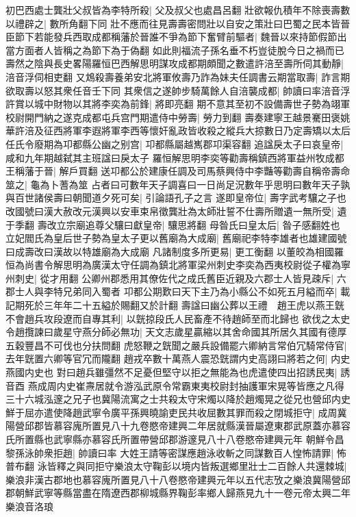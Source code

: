 初巴西處士龔壯父叔皆為李特所殺|{
	父及叔父也處昌呂翻}
壯欲報仇積年不除喪壽數以禮辟之|{
	數所角翻下同}
壯不應而往見壽壽密問壯以自安之策壯曰巴蜀之民本皆晉臣節下若能發兵西取成都稱藩於晉誰不爭為節下奮臂前驅者|{
	魏晉以來持節假節出當方面者人皆稱之為節下為于偽翻}
如此則福流子孫名垂不朽豈徒脫今日之禍而已壽然之陰與長史畧陽羅恒巴西解思明謀攻成都期頗聞之數遣許涪至壽所伺其動靜|{
	涪音浮伺相吏翻}
又鴆殺壽養弟安北將軍攸壽乃詐為妹夫任調書云期當取壽|{
	詐言期欲取壽以怒其衆任音壬下同}
其衆信之遂帥步騎萬餘人自涪襲成都|{
	帥讀曰率涪音浮}
許賞以城中財物以其將李奕為前鋒|{
	將即亮翻}
期不意其至初不設備壽世子勢為翊軍校尉開門納之遂克成都屯兵宫門期遣侍中勞壽|{
	勞力到翻}
壽奏建寧王越景騫田褒姚華許涪及征西將軍李遐將軍李西等懷奸亂政皆收殺之縱兵大掠數日乃定壽矯以太后任氏令廢期為卭都縣公幽之别宫|{
	卭都縣屬越嶲郡卭渠容翻}
追諡戾太子曰哀皇帝|{
	咸和九年期越弑其主班諡曰戾太子}
羅恒解思明李奕等勸壽稱鎮西將軍益州牧成都王稱藩于晉|{
	解戶買翻}
送卭都公於建康任調及司馬蔡興侍中李豔等勸壽自稱帝壽命筮之|{
	龜為卜蓍為筮}
占者曰可數年天子調喜曰一日尚足況數年乎思明曰數年天子孰與百世諸侯壽曰朝聞道夕死可矣|{
	引論語孔子之言}
遂即皇帝位|{
	壽字武考驤之子也}
改國號曰漢大赦改元漢興以安車束帛徵龔壯為太師壯誓不仕壽所贈遺一無所受|{
	遺于季翻}
壽改立宗廟追尊父驤曰獻皇帝|{
	驤思將翻}
母昝氏曰皇太后|{
	昝子感翻姓也}
立妃閻氏為皇后世子勢為皇太子更以舊廟為大成廟|{
	舊廟祀李特李雄者也雄建國號曰成壽改曰漢故以特雄廟為大成廟}
凡諸制度多所更易|{
	更工衡翻}
以董皎為相國羅恒為尚書令解思明為廣漢太守任調為鎮北將軍梁州刺史李奕為西夷校尉從子權為寧州刺史|{
	從才用翻}
公卿州郡悉用其僚佐代之成氏舊臣近親及六郡士人皆見疎斥|{
	六郡士人與李特兄弟同入蜀者}
卭都公期歎曰天下主乃為小縣公不如死五月縊而卒|{
	載記期死於三年年二十五縊於賜翻又於計翻}
壽諡曰幽公葬以王禮　趙王虎以燕王皝不會趙兵攻段遼而自專其利|{
	以皝掠段氏人民畜產不待趙師至而北歸也}
欲伐之太史令趙攬諫曰歲星守燕分師必無功|{
	天文志歲星贏縮以其舍命國其所居久其國有德厚五穀豐昌不可伐也分扶問翻}
虎怒鞭之皝聞之嚴兵設備罷六卿納言常伯冗騎常侍官|{
	去年皝置六卿等官冗而隴翻}
趙戎卒數十萬燕人震恐皝謂内史高詡曰將若之何|{
	内史燕國内史也}
對曰趙兵雖彊然不足憂但堅守以拒之無能為也虎遣使四出招誘民夷|{
	誘音酉}
燕成周内史崔燾居就令游泓武原令常霸東夷校尉封抽護軍宋晃等皆應之凡得三十六城泓邃之兄子也冀陽流寓之士共殺太守宋燭以降於趙燭晃之從兄也營邱内史鮮于屈亦遣使降趙武寧令廣平孫興曉諭吏民共收屈數其罪而殺之閉城拒守|{
	成周冀陽營邱郡皆慕容廆所置見八十九卷愍帝建興二年居就縣漢晉屬遼東郡武原蓋亦慕容氏所置縣也武寧縣亦慕容氏所置帶營邱郡游邃見八十八卷愍帝建興元年}
朝鮮令昌黎孫泳帥衆拒趙|{
	帥讀曰率}
大姓王請等密謀應趙泳收斬之同謀數百人惶怖請罪|{
	怖普布翻}
泳皆釋之與同拒守樂浪太守鞠彭以境内皆叛選鄉里壯士二百餘人共還棘城|{
	樂浪非漢古郡地也慕容廆所置見八十八卷愍帝建興元年以五代志攷之樂浪冀陽營邱郡朝鮮武寧等縣當盡在隋遼西郡柳城縣界鞠彭率鄉人歸燕見九十一卷元帝太興二年樂浪音洛琅}

